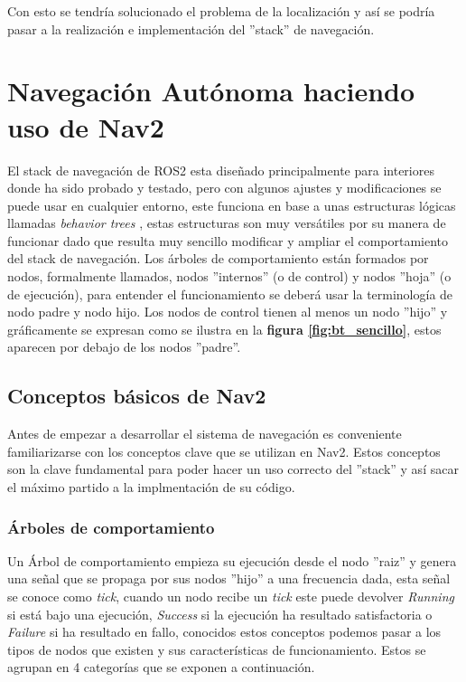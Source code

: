 Con esto se tendría solucionado el problema de la localización y así se podría pasar a la realización e implementación del ''stack'' 
de navegación.

\section{Navegación Autónoma haciendo uso de Nav2}

El stack de navegación de ROS2 esta diseñado principalmente para interiores donde ha sido probado y testado, pero con algunos ajustes y modificaciones se puede usar en cualquier entorno, este funciona en base a unas estructuras 
lógicas llamadas \textit{behavior trees} \cite{colledanchise2018behavior}, estas estructuras son muy versátiles por su manera de funcionar dado que resulta muy 
sencillo modificar y ampliar el comportamiento del stack de navegación. Los árboles de comportamiento están formados por nodos, formalmente llamados, 
nodos ''internos'' (o de control) y nodos ''hoja'' (o de ejecución), para entender el funcionamiento se deberá usar la terminología de nodo padre y nodo hijo. 
Los nodos de control tienen al menos un nodo ''hijo'' y gráficamente se expresan como se ilustra en la \textbf{figura \ref{fig:bt_sencillo}}, estos aparecen por debajo de 
los nodos ''padre''.

\subsection{Conceptos básicos de Nav2}
Antes de empezar a desarrollar el sistema de navegación es conveniente familiarizarse con los conceptos clave que se utilizan en Nav2. Estos conceptos 
son la clave fundamental para poder hacer un uso correcto del ''stack'' y así sacar el máximo partido a la implmentación de su código.

\subsubsection{Árboles de comportamiento}
Un Árbol de comportamiento empieza su ejecución desde el nodo ''raiz'' y genera una señal que se propaga por sus nodos ''hijo'' a una frecuencia dada, 
esta señal se conoce como \textit{tick}, cuando un nodo recibe un \textit{tick} este puede devolver \textit{Running} si está bajo una ejecución, 
\textit{Success} si la ejecución ha resultado satisfactoria o \textit{Failure} si ha resultado en fallo, conocidos estos conceptos podemos pasar 
a los tipos de nodos que existen y sus características de funcionamiento. Estos se agrupan en 4 categorías que se exponen a continuación.

